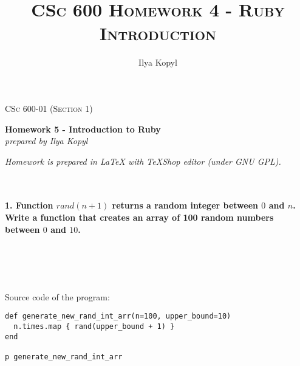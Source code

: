 \documentclass{article}
\author{Ilya Kopyl}
\begin{document}
	\setlength{\grammarparsep}{5pt plus 1pt minus 1pt} %
	\setlength{\grammarindent}{13em} %




	\begin{titlepage}
		\begin{center}
				\Large\textsc{CSc 600-01 (Section 1)}
				
				\Large\textbf{Homework 5 - Introduction to Ruby}\\

				\Large\textit{prepared by Ilya Kopyl}
				
		\end{center}	
	\end{titlepage}


	\title{\textsc{CSc 600 Homework 4 - Ruby Introduction}}	
	\maketitle
	
		\noindent \textit{Homework is prepared in LaTeX with TeXShop editor (under GNU GPL).}
		


	\rmfamily\




	\paragraph{1. Function \(rand(n+1)\) returns a random integer between \(0\) and \(n\). Write a function that creates an array of 100 random numbers between \(0\) and \(10\).}\

\paragraph{}\

Source code of the program:

\begin{verbatim}
def generate_new_rand_int_arr(n=100, upper_bound=10)
  n.times.map { rand(upper_bound + 1) }
end

p generate_new_rand_int_arr
\end{verbatim}
\end{document}

